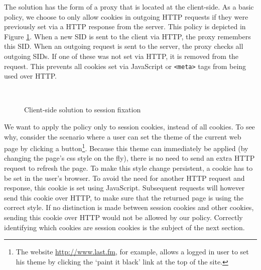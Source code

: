 The solution has the form of a proxy that is located at the client-side. As a basic policy, we choose to only allow cookies in outgoing HTTP requests if they were previously set via a HTTP response from the server. This policy is depicted in Figure \ref{fig:clientside-proxy}. When a new SID is sent to the client via HTTP, the proxy remembers this SID. When an outgoing request is sent to the server, the proxy checks all outgoing SIDs. If one of these was not set via HTTP, it is removed from the request. This prevents all cookies set via JavaScript or \texttt{<meta>} tags from being used over HTTP.

\begin{figure}[htb]
	\centering
	\\
	\caption{Client-side solution to session fixation}
	\label{fig:clientside-proxy}
\end{figure}

We want to apply the policy only to \glspl{session cookie}, instead of all cookies. To see why, consider the scenario where a user can set the theme of the current web page by clicking a button\footnote{The website \url{http://www.last.fm}, for example, allows a logged in user to set his theme by clicking the `paint it black' link at the top of the site.}. Because this theme can immediately be applied (by changing the page's css style on the fly), there is no need to send an extra HTTP request to refresh the page. To make this style change persistent, a cookie has to be set in the user's browser. To avoid the need for another HTTP request and response, this cookie is set using JavaScript. Subsequent requests will however send this cookie over HTTP, to make sure that the returned page is using the correct style. If no distinction is made between session cookies and other cookies, sending this cookie over HTTP would not be allowed by our policy. Correctly identifying which cookies are session cookies is the subject of the next section.

